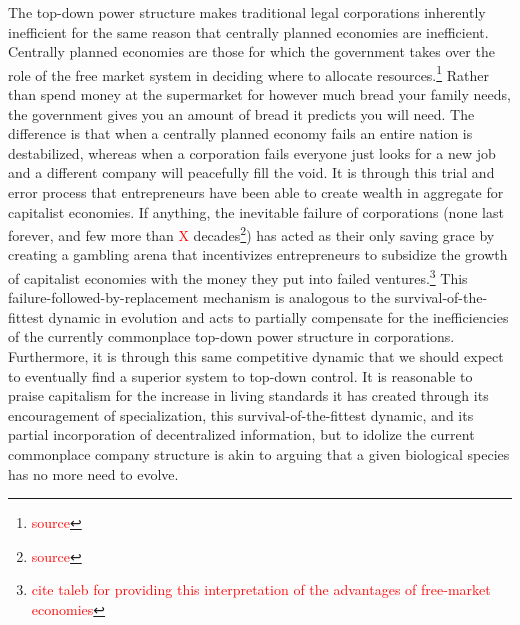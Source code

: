 \documentclass{article}[10pt]
\begin{document}
The top-down power structure makes traditional legal corporations inherently inefficient for the same reason that centrally planned economies are inefficient.
Centrally planned economies are those for which the government takes over the role of the free market system in deciding where to allocate resources.\footnote{
    \textcolor{red}{source}}
Rather than spend money at the supermarket for however much bread your family needs, the government gives you an amount of bread it predicts you will need.
The difference is that when a centrally planned economy fails an entire nation is destabilized, whereas when a corporation fails everyone just looks for a new job and a different company will peacefully fill the void.
It is through this trial and error process that entrepreneurs have been able to create wealth in aggregate for capitalist economies.
If anything, the inevitable failure of corporations (none last forever, and few more than \textcolor{red}{X} decades\footnote{
    \textcolor{red}{source}})
has acted as their only saving grace by creating a gambling arena that incentivizes entrepreneurs to subsidize the growth of capitalist economies with the money they put into failed ventures.\footnote{
    \textcolor{red}{cite taleb for providing this interpretation of the advantages of free-market economies}}
This failure-followed-by-replacement mechanism is analogous to the survival-of-the-fittest dynamic in evolution and acts to partially compensate for the inefficiencies of the currently commonplace top-down power structure in corporations.
Furthermore, it is through this same competitive dynamic that we should expect to eventually find a superior system to top-down control.
It is reasonable to praise capitalism for the increase in living standards it has created through its encouragement of specialization, this survival-of-the-fittest dynamic, and its partial incorporation of decentralized information, but to idolize the current commonplace company structure is akin to arguing that a given biological species has no more need to evolve.\par
\end{document}
